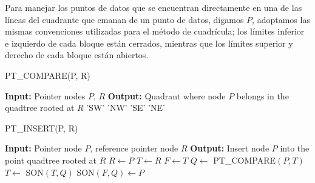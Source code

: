 \documentclass[9pt,a4paper,twoside]{rho-class/rho}
\begin{document}
            Para manejar los puntos de datos que se encuentran directamente en una de las líneas del cuadrante que emanan de un punto de datos, digamos \(P\), adoptamos las mismas convenciones utilizadas para el método de cuadrícula; los límites inferior e izquierdo de cada bloque están cerrados, mientras que los límites superior y derecho de cada bloque están abiertos.\cite{samet_spatial_structures}
            \begin{algorithm}
                \caption{PT\_COMPARE(P, R)}
                \begin{algorithmic}[1]
                    \Statex \textbf{Input:} Pointer nodes $P$, $R$
                    \Statex \textbf{Output:} Quadrant where node $P$ belongs in the quadtree rooted at $R$
                    \State \Return 'SW'
                    \Else
                    \State \Return 'NW'
                    \EndIf
                    \Else
                    \State \Return 'SE'
                    \Else
                    \State \Return 'NE'
                    \EndIf
                    \EndIf
                \end{algorithmic}
            \end{algorithm}
            \begin{algorithm}
                \caption{PT\_INSERT(P, R)}
                \begin{algorithmic}[1]
                    \Statex \textbf{Input:} Pointer node $P$, reference pointer node $R$
                    \Statex \textbf{Output:} Insert node $P$ into the point quadtree rooted at $R$
                    \State $R \gets P$ 
                    \Else
                    \State $T \gets R$
                    \State $F \gets T$ 
                    \State $Q \gets$ PT\_COMPARE$(P, T)$
                    \State $T \gets$ SON$(T, Q)$
                    \EndWhile
                    \State SON$(F, Q) \gets P$ 
                    \EndIf
                    \EndIf
                \end{algorithmic}
            \end{algorithm}
            
\end{document}
